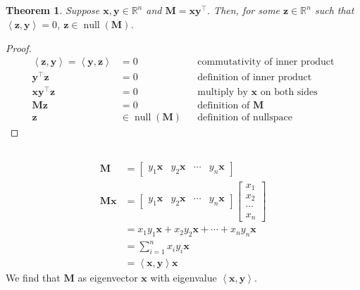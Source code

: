 \documentclass[]{article}
\newtheorem{genthm}{Theorem}
\newcommand{\iprod}[2]{\left\langle #1, #2 \right\rangle}
\newcommand{\tpose}[1]{#1^{\! \top} \!}
\begin{document}
\subsection{}

\begin{genthm}
	Suppose \(\bm{x}, \bm{y} \in \mathbb{R}^n\) and \(\bm{M} = \bm{x} \tpose{\bm{y}}\).
	Then, for some \(\bm{z} \in \mathbb{R}^n\) such that \(\iprod{\bm{z}}{\bm{y}} = 0\), \(\bm{z} \in \operatorname{null}(\bm{M})\). 
\end{genthm}

\begin{proof}
\begin{align}
	\iprod{\bm{z}}{\bm{y}} = \iprod{\bm{y}}{\bm{z}} &= 0 && \text{commutativity of inner product} \\
	\tpose{\bm{y}} \bm{z} &= 0 && \text{definition of inner product} \\
	\bm{x} \tpose{\bm{y}} \bm{z} &= 0 && \text{multiply by } \bm{x} \text{ on both sides} \\
	\bm{M} \bm{z} &= 0 && \text{definition of } \bm{M} \\
	\bm{z} &\in \operatorname{null}(\bm{M}) && \text{definition of nullspace}
\end{align}
\end{proof}

\subsection{}

\begin{align}
	\bm{M} &=
	\begin{bmatrix}
	y_1 \bm{x} & y_2 \bm{x} & \cdots & y_n \bm{x}
	\end{bmatrix} \\
	\bm{Mx} &=
	\begin{bmatrix}
	y_1 \bm{x} & y_2 \bm{x} & \cdots & y_n \bm{x}
	\end{bmatrix}
	\begin{bmatrix}
	x_1 \\
	x_2 \\
	\cdots \\
	x_n
	\end{bmatrix} \\
	&= x_1 y_1 \bm{x} + x_2 y_2 \bm{x} + \cdots + x_n y_n \bm{x} \\
	&= \sum_{i = 1}^n x_i y_i \bm{x} \\
	&= \iprod{\bm{x}}{\bm{y}} \bm{x}
\end{align}
We find that \(\bm{M}\) as eigenvector \(\bm{x}\) with eigenvalue \(\iprod{\bm{x}}{\bm{y}}\).
\end{document}
